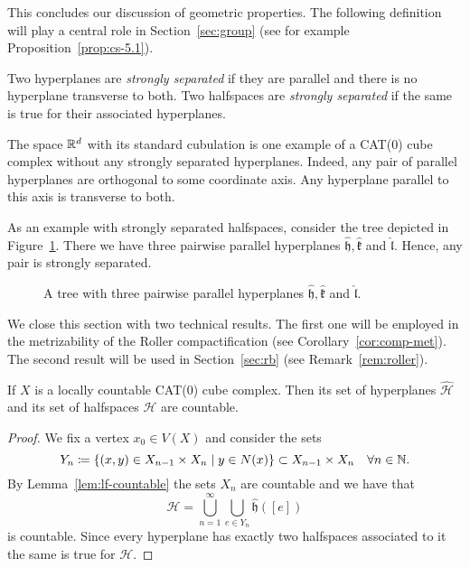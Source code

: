 This concludes our discussion of geometric properties. The following definition will play a central role in Section~\ref{sec:group} (see for example Proposition~\ref{prop:cs-5.1}).

\begin{defin}
  \label{defin:strong-sep}
  Two hyperplanes are \emph{strongly separated} if they are parallel and there is no hyperplane transverse to both. Two halfspaces are \emph{strongly separated} if the same is true for their associated hyperplanes.
\end{defin}

\begin{bsp}
  The space \(\mathbb{R}^d\) with its standard cubulation is one example of a CAT(0) cube complex without any strongly separated hyperplanes. Indeed, any pair of parallel hyperplanes are orthogonal to some coordinate axis. Any hyperplane parallel to this axis is transverse to both.

  As an example with strongly separated halfspaces, consider the tree depicted in Figure~\ref{fig:str-sep}. There we have three pairwise parallel hyperplanes \(\mathfrak{\hat h}, \mathfrak{\hat k}\) and \(\mathfrak{\hat l}\). Hence, any pair is strongly separated.

  \begin{figure}[htbp]
    \centering
    
    \caption{A tree with three pairwise parallel hyperplanes \(\mathfrak{\hat h}, \mathfrak{\hat k}\) and \(\mathfrak{\hat l}\).}
    \label{fig:str-sep}
  \end{figure}
\end{bsp}

We close this section with two technical results. The first one will be employed in the metrizability of the Roller compactification (see Corollary~\ref{cor:comp-met}). The second result will be used in Section~\ref{sec:rb} (see Remark~\ref{rem:roller}).

\begin{cor}
  \label{cor:halfspace-countable}
  If \(X\) is a locally countable CAT(0) cube complex. Then its set of hyperplanes \(\mathcal{\hat H}\) and its set of halfspaces \(\mathcal{H}\) are countable.
\end{cor}

\begin{proof}
  We fix a vertex \(x_0 \in V(X)\) and consider the sets
  \[
    Y_n \coloneqq \{(x,y) \in X_{n-1} \times X_{n} \mid y \in N(x)\} \subset X_{n-1} \times X_n \quad \forall n \in \mathbb{N}.
  \]
  By Lemma~\ref{lem:lf-countable} the sets \(X_n\) are countable and we have that
  \[
    \mathcal{\hat H} = \bigcup_{n=1}^\infty \bigcup_{e \in Y_n} \mathfrak{\hat h}([e])
  \]
  is countable. Since every hyperplane has exactly two halfspaces associated to it the same is true for \(\mathcal{H}\).
\end{proof}


